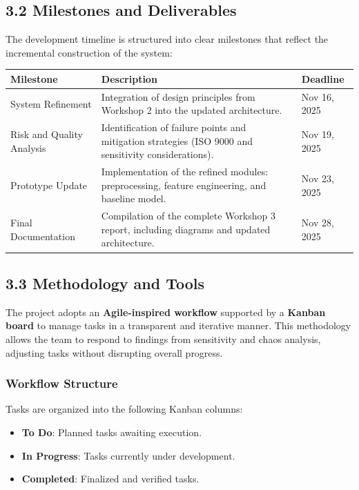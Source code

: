 \documentclass[12pt]{report}
\begin{document}
\subsection*{3.2 Milestones and Deliverables}

The development timeline is structured into clear milestones that reflect the incremental construction of the system:

\begin{center}
\begin{tabular}{|p{4cm}|p{7cm}|p{3cm}|}
\hline
\textbf{Milestone} & \textbf{Description} & \textbf{Deadline} \\
\hline
System Refinement & Integration of design principles from Workshop 2 into the updated architecture. & Nov 16, 2025 \\
\hline
Risk and Quality Analysis & Identification of failure points and mitigation strategies (ISO 9000 and sensitivity considerations). & Nov 19, 2025 \\
\hline
Prototype Update & Implementation of the refined modules: preprocessing, feature engineering, and baseline model. & Nov 23, 2025 \\
\hline
Final Documentation & Compilation of the complete Workshop 3 report, including diagrams and updated architecture. & Nov 28, 2025 \\
\hline
\end{tabular}
\end{center}

\subsection*{3.3 Methodology and Tools}

The project adopts an \textbf{Agile-inspired workflow} supported by a \textbf{Kanban board} to manage tasks in a transparent and iterative manner. This methodology allows the team to respond to findings from sensitivity and chaos analysis, adjusting tasks without disrupting overall progress.

\subsubsection*{Workflow Structure}

Tasks are organized into the following Kanban columns:

\begin{itemize}
    \item \textbf{To Do}: Planned tasks awaiting execution.
    \item \textbf{In Progress}: Tasks currently under development.
    \item \textbf{Completed}: Finalized and verified tasks.
\end{itemize}
\end{document}
